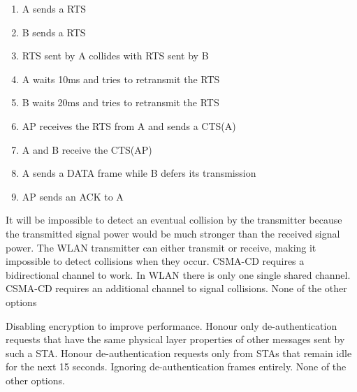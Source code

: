 \begin{solution}
    \begin{enumerate}
        \item A sends a RTS
        \item B sends a RTS
        \item RTS sent by A collides with RTS sent by B
        \item A waits 10ms and tries to retransmit the RTS
        \item B waits 20ms and tries to retransmit the RTS
        \item AP receives the RTS from A and sends a CTS(A)
        \item A and B receive the CTS(AP)
        \item A sends a DATA frame while B defers its transmission
        \item AP sends an ACK to A
    \end{enumerate}
\end{solution}

\begin{checkboxes}
    \CorrectChoice It will be impossible to detect an eventual collision by the transmitter because the transmitted signal power would be much stronger than the received signal power.
    \CorrectChoice The WLAN transmitter can either transmit or receive, making it impossible to detect collisions when they occur.
    \choice CSMA-CD requires a bidirectional channel to work. In WLAN there is only one single shared channel.
    \choice CSMA-CD requires an additional channel to signal collisions.
    \choice None of the other options
\end{checkboxes}

\begin{checkboxes}
    \choice Disabling encryption to improve performance.
    \CorrectChoice Honour only de-authentication requests that have the same physical layer properties of other messages sent by such a STA.
    \CorrectChoice Honour de-authentication requests only from STAs that remain idle for the next 15 seconds.
    \CorrectChoice Ignoring de-authentication frames entirely.
    \choice None of the other options.
\end{checkboxes}

